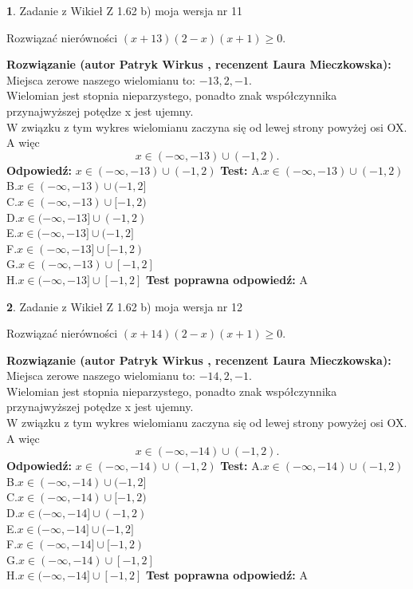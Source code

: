 \documentclass[12pt, a4paper]{article}
\theoremstyle{definition} %
\newtheorem{zad}{}
\newcommand{\zadStart}[1]{\begin{zad}#1\newline}
\newcommand{\zadStop}{\end{zad}}
\newcommand{\rozwStart}[2]{\noindent \textbf{Rozwiązanie (autor #1 , recenzent #2): }\newline}
\newcommand{\rozwStop}{\newline}
\newcommand{\odpStart}{\noindent \textbf{Odpowiedź:}\newline}
\newcommand{\odpStop}{\newline}
\newcommand{\testStart}{\noindent \textbf{Test:}\newline}
\newcommand{\testStop}{\newline}
\newcommand{\kluczStart}{\noindent \textbf{Test poprawna odpowiedź:}\newline}
\newcommand{\kluczStop}{\newline}
\begin{document}
\zadStart{Zadanie z Wikieł Z 1.62 b) moja wersja nr 11}

Rozwiązać nierówności $(x+13)(2-x)(x+1)\ge0$.
\zadStop
\rozwStart{Patryk Wirkus}{Laura Mieczkowska}
Miejsca zerowe naszego wielomianu to: $-13, 2, -1$.\\
Wielomian jest stopnia nieparzystego, ponadto znak współczynnika przy\linebreak najwyższej potędze x jest ujemny.\\ W związku z tym wykres wielomianu zaczyna się od lewej strony powyżej osi OX. A więc $$x \in (-\infty,-13) \cup (-1,2).$$
\rozwStop
\odpStart
$x \in (-\infty,-13) \cup (-1,2)$
\odpStop
\testStart
A.$x \in (-\infty,-13) \cup (-1,2)$\\
B.$x \in (-\infty,-13) \cup (-1,2]$\\
C.$x \in (-\infty,-13) \cup [-1,2)$\\
D.$x \in (-\infty,-13] \cup (-1,2)$\\
E.$x \in (-\infty,-13] \cup (-1,2]$\\
F.$x \in (-\infty,-13] \cup [-1,2)$\\
G.$x \in (-\infty,-13) \cup [-1,2]$\\
H.$x \in (-\infty,-13] \cup [-1,2]$
\testStop
\kluczStart
A
\kluczStop



\zadStart{Zadanie z Wikieł Z 1.62 b) moja wersja nr 12}

Rozwiązać nierówności $(x+14)(2-x)(x+1)\ge0$.
\zadStop
\rozwStart{Patryk Wirkus}{Laura Mieczkowska}
Miejsca zerowe naszego wielomianu to: $-14, 2, -1$.\\
Wielomian jest stopnia nieparzystego, ponadto znak współczynnika przy\linebreak najwyższej potędze x jest ujemny.\\ W związku z tym wykres wielomianu zaczyna się od lewej strony powyżej osi OX. A więc $$x \in (-\infty,-14) \cup (-1,2).$$
\rozwStop
\odpStart
$x \in (-\infty,-14) \cup (-1,2)$
\odpStop
\testStart
A.$x \in (-\infty,-14) \cup (-1,2)$\\
B.$x \in (-\infty,-14) \cup (-1,2]$\\
C.$x \in (-\infty,-14) \cup [-1,2)$\\
D.$x \in (-\infty,-14] \cup (-1,2)$\\
E.$x \in (-\infty,-14] \cup (-1,2]$\\
F.$x \in (-\infty,-14] \cup [-1,2)$\\
G.$x \in (-\infty,-14) \cup [-1,2]$\\
H.$x \in (-\infty,-14] \cup [-1,2]$
\testStop
\kluczStart
A
\kluczStop
\end{document}

